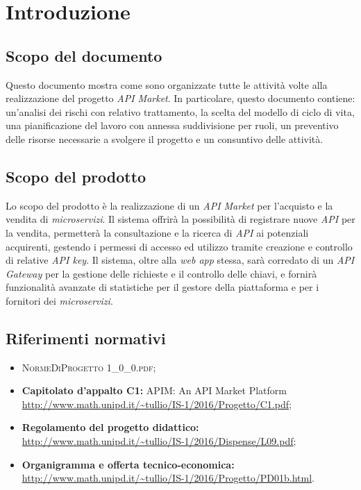 \newpage
\section{Introduzione}

\subsection{Scopo del documento}
Questo documento mostra come sono organizzate tutte le attività volte alla realizzazione del progetto \textit{API Market}. In particolare, questo documento contiene: un'analisi dei rischi con relativo trattamento, la scelta del modello di ciclo di vita, una pianificazione del lavoro con annessa suddivisione per ruoli, un preventivo delle risorse necessarie a svolgere il progetto e un consuntivo delle attività.

\subsection{Scopo del prodotto}
Lo scopo del prodotto è la realizzazione di un \textit{API Market} per l'acquisto e la vendita di \textit{microservizi}. Il sistema offrirà la possibilità di registrare nuove \textit{API} per la vendita, permetterà la consultazione e la ricerca di \textit{API} ai potenziali acquirenti, gestendo i permessi di accesso ed utilizzo tramite creazione e controllo di relative \textit{API key}. Il sistema, oltre alla \textit{web app} stessa, sarà corredato di un \textit{API Gateway} per la gestione delle richieste e il controllo delle chiavi, e fornirà funzionalità avanzate di statistiche per il gestore della piattaforma e per i fornitori dei \textit{microservizi}.

\subsection{Riferimenti normativi}
\begin{itemize}
\item \textsc{NormeDiProgetto 1\_0\_0.pdf};
\item \textbf{Capitolato d’appalto C1:} APIM: An API Market Platform\\ \url{http://www.math.unipd.it/~tullio/IS-1/2016/Progetto/C1.pdf};
\item \textbf{Regolamento del progetto didattico:}\\
\url{http://www.math.unipd.it/~tullio/IS-1/2016/Dispense/L09.pdf};
\item \textbf{Organigramma e offerta tecnico-economica:}\\
\url{http://www.math.unipd.it/~tullio/IS-1/2016/Progetto/PD01b.html}.
\end{itemize}

